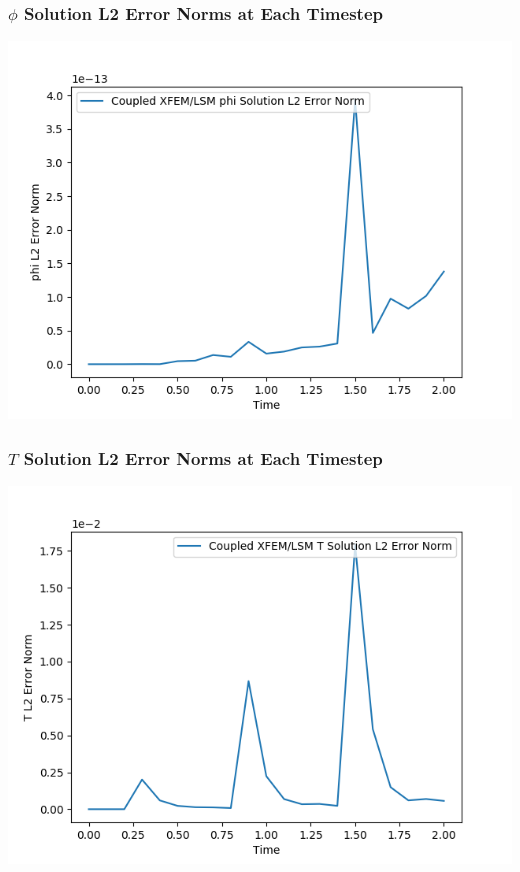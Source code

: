 \documentclass[]{beamer}
\begin{document}
\begin{frame}[t]\frametitle{$\phi$ Solution L2 Error Norms at Each Timestep}
	\begin{center}
		\includegraphics[scale=0.5]{figures/ls-xfem-2D_rz_homog1mat_phi_L2_Errs}
	\end{center}
\end{frame}

\begin{frame}[t]\frametitle{$T$ Solution L2 Error Norms at Each Timestep}
	\begin{center}
		\includegraphics[scale=0.5]{figures/ls-xfem-2D_rz_homog1mat_u_L2_Errs}
	\end{center}
\end{frame}
\end{document}
